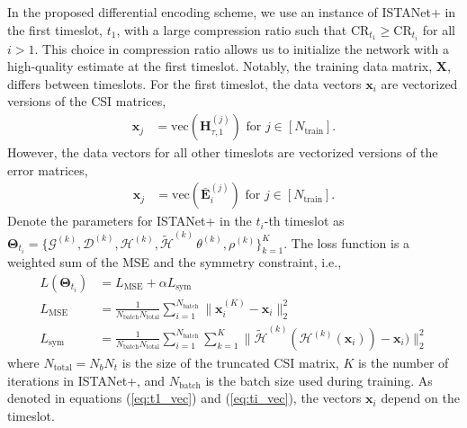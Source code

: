 In the proposed differential encoding scheme, we use an instance of ISTANet+ in the first timeslot, $t_1$, with a large compression ratio such that $\text{CR}_{t_1} \geq \text{CR}_{t_i}$ for all $i > 1$. This choice in compression ratio allows us to initialize the network with a high-quality estimate at the first timeslot. Notably, the training data matrix, $\mathbf X$, differs between timeslots. For the first timeslot, the data vectors $\mathbf{x}_i$ are vectorized versions of the CSI matrices,
\begin{align}
    \mathbf{x}_j &= \text{vec}\left(\mathbf{H}^{(j)}_{\tau,1}\right) \text{ for } j\in[N_{\text{train}}]. 
    \label{eq:t1_vec}
\end{align}
However, the data vectors for all other timeslots are vectorized versions of the error matrices,
\begin{align}
    \mathbf{x}_j &= \text{vec}\left(\bar{\mathbf{E}}^{(j)}_{i}\right) \text{ for } j\in[N_{\text{train}}]. 
    \label{eq:ti_vec}
\end{align}
Denote the parameters for ISTANet+ in the $t_i$-th timeslot as $\mathbf{\Theta}_{t_i}=\{\mathcal G^{(k)}, \mathcal D^{(k)},  \mathcal H^{(k)}, \tilde{\mathcal H}^{(k)}\, \theta^{(k)}, \rho^{(k)}\}_{k=1}^{K}$. The loss function is a weighted sum of the MSE and the symmetry constraint, i.e.,
\begin{align}
    L(\mathbf{\Theta}_{t_i}) &= L_{\text{MSE}} + \alpha L_{\text{sym}} \\
    L_{\text{MSE}} &= \frac{1}{N_{\text{batch}}N_{\text{total}}}\sum_{i=1}^{N_{\text{batch}}}\|\mathbf{x}_i^{(K)}-\mathbf{x}_i\|_2^2 \\
    L_{\text{sym}} &= \frac{1}{N_{\text{batch}}N_{\text{total}}}\sum_{i=1}^{N_{\text{batch}}}\sum_{k=1}^{K} \|\tilde{\mathcal{H}}^{(k)}(\mathcal{H}^{(k)}(\mathbf{x}_i)) - \mathbf{x}_i)\|_2^2
\end{align}
where $N_{\text{total}}=N_bN_t$ is the size of the truncated CSI matrix, $K$ is the number of iterations in ISTANet+, and $N_{\text{batch}}$ is the batch size used during training. As denoted in equations (\ref{eq:t1_vec}) and (\ref{eq:ti_vec}), the vectors $\mathbf{x}_i$ depend on the timeslot.




